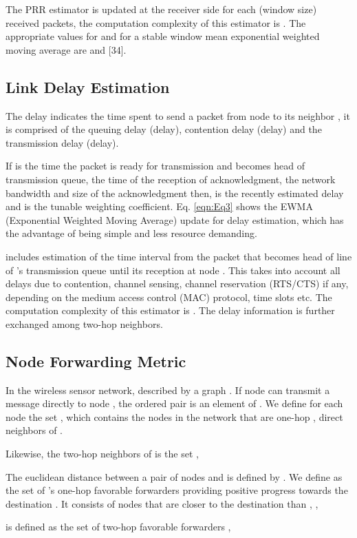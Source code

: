 \documentclass[fleqn,twoside]{article}
\begin{document}
The PRR estimator is updated at the receiver side for each  (window size) received packets, the computation complexity of
this estimator is . The appropriate values for  and  for a stable window mean exponential weighted moving average are  and [34].


\subsection{Link Delay Estimation}
The delay indicates the time spent to send a packet from node  to its neighbor , it is comprised of the queuing delay (delay), 
contention delay (delay) and the transmission delay (delay).

If  is the time the packet is ready for transmission and becomes head of transmission queue,  the time of the reception of acknowledgment,  the network bandwidth and size of the acknowledgment then,  is the recently
estimated delay and  is the tunable weighting coefficient. Eq. \ref{eqn:Eq3} shows the EWMA (Exponential Weighted 
Moving Average) update for delay 
estimation, which has the advantage of being simple and less resource demanding. 

 includes estimation of the time interval from the packet that becomes head of line of 's transmission queue until 
its reception at node . This takes into account all delays due
to contention, channel sensing, channel reservation (RTS/CTS) if any, depending on the medium access control (MAC) protocol, time slots etc. The computation complexity of this estimator is . The delay information is further exchanged among two-hop neighbors.

\subsection{Node Forwarding Metric}
In the wireless sensor network, described by a graph . If node  
can transmit a message directly to node , the ordered pair is an element of . We define for each node  the set , which contains the nodes
in the network  that are one-hop , direct neighbors of .


Likewise, the two-hop neighbors of  is the set  ,

The euclidean distance between a pair of nodes  and  is defined by . We define  as the set of 's one-hop favorable forwarders providing positive progress towards the destination . It consists of nodes that are closer to the destination than , ,

 is defined as the set of two-hop favorable forwarders ,
\end{document}
